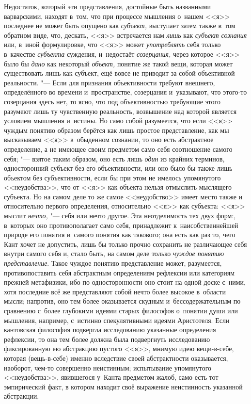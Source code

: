 Недостаток, который эти представления, достойные быть
названными варварскими, находят в~том, что при процессе мышления о~нашем
<<я>> последнее не может быть опущено как
{\em субъект,} выступает
затем также в~том обратном виде, что, дескать, <<я>> встречается нам
{\em лишь} как
{\em субъект сознания}
или, в~иной формулировке, что <<я>> может
{\em употреблять} себя
только в~качестве {\em субъекта}
суждения, и~недостаёт
{\em созерцания,} через
которое <<я>> было бы {\em дано}
как некоторый
{\em объект,} понятие же
такой вещи, которая может существовать лишь как субъект, ещё вовсе не
приводит за собой объективной
реальности\label{bkm:bm98}.
"--- Если для признания объективности требуют внешнего,
определённого во времени и~пространстве, созерцания и~указывают, что
этого-то созерцания здесь нет, то ясно, что под объективностью требующие
этого разумеют лишь ту чувственную реальность, возвышение над которой
является условием мышления и~истины. Но само собой разумеется, что если <<я>>
чуждым понятию образом берётся как лишь простое представление, как мы
высказываем <<я>> в~обыденном сознании, то оно есть абстрактное определение,
а не имеющее своим предметом само себя соотношение самого
себя; "--- взятое таким образом, оно есть лишь
{\em один} из крайних
терминов, односторонний субъект без его объективности, или оно было бы
также лишь объектом без субъективности, если бы при этом не имелось
упомянутого <<неудобства>>, что от <<я>> как объекта нельзя отмыслить мыслящего
субъекта. Но на самом деле то же самое <<неудобство>> имеет место также и
относительно первого определения, относительно <<я>> как субъекта: <<я>> мыслит
{\em нечто,} "--- себя или
нечто другое. Эта неотделимость тех двух форм:, в~которых оно
противополагает само себя, принадлежит к~наисобственнейшей природе его
понятия и~самого понятия как такового; она есть как раз то, чего Кант хочет
не допустить, лишь бы только прочно сохранить не различающее
себя внутри самого себя и, стало быть, на самом деле только
{\em чуждое понятию представление}.
Такое чуждое понятию представление может, разумеется,
противопоставить себя абстрактным определениям рефлексии или категориям
прежней метафизики, ибо по односторонности оно стоит на одной доске с~ними,
хотя последние всё же представляют собой нечто более высокое в~области
мысли; напротив, оно тем более оказывается скудным и~бессодержательным по
сравнению с~более глубокими идеями старых философов о~понятии души или
мышления, например, с~истинно спекулятивными идеями Аристотеля. Если
кантовская философия подвергла исследованию указанные определения
рефлексии, то она тем более должна была подвергнуть исследованию
фиксированную ею абстракцию пустого <<я>>, мнимую идею вещи-в-себе, которая
(вещь-в-себе) именно вследствие своей абстрактности оказывается, наоборот,
чем-то совершенно неистинным; испытывание упомянутого <<неудобства>>,
явившегося у~Канта предметом жалоб, само есть тот эмпирический факт, в
котором находит своё выражение неистинность указанной абстракции.

